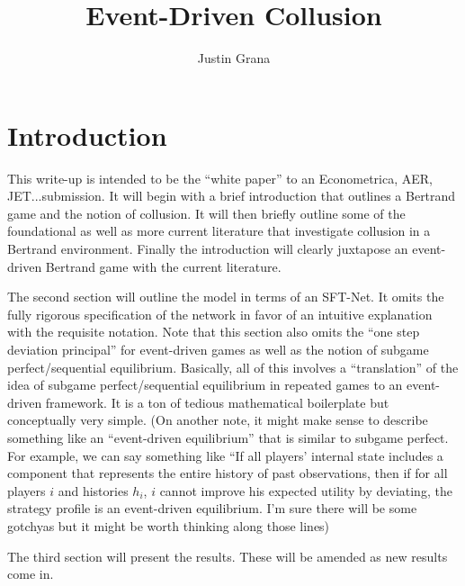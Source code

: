 \documentclass{article}
\begin{document}
\title{Event-Driven Collusion}
\author{Justin Grana}
\maketitle

\section{Introduction}
This write-up is intended to be the ``white paper'' to an
Econometrica, AER, JET...submission.  It will begin with a brief
introduction that outlines a Bertrand game and the notion of
collusion.  It will then briefly outline some of the foundational as
well as more current literature that investigate collusion in a
Bertrand environment.  Finally the introduction will clearly juxtapose
an event-driven Bertrand game with the current literature.

The second section will outline the model in terms of an SFT-Net.  It
omits the fully rigorous specification of the network in favor of an
intuitive explanation with the requisite notation.  Note that this
section also omits the ``one step deviation principal'' for
event-driven games as well as the notion of subgame perfect/sequential
equilibrium.  Basically, all of this involves a ``translation'' of the
idea of subgame perfect/sequential equilibrium in repeated games to an
event-driven framework.  It is a ton of tedious mathematical
boilerplate but conceptually very simple.  (On another note, it might
make sense to describe something like an ``event-driven equilibrium''
that is similar to subgame perfect.  For example, we can say something
like ``If all players' internal state includes a component that
represents the entire history of past observations, then if for
all players $i$ and histories $h_i$, $i$ cannot improve his expected
utility by deviating, the strategy profile is an event-driven
equilibrium.  I'm sure there will be some gotchyas but it might be
worth thinking along those lines)

The third section will present the results.  These will be amended as
new results come in.
\end{document}
